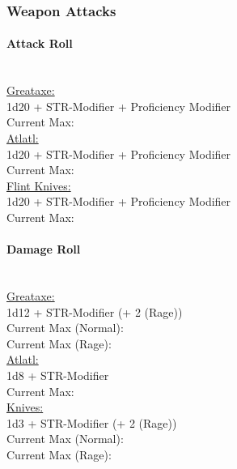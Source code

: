 \documentclass[letterpaper,openany,oneside,twocolumn]{book}
\begin{document}
\subsubsection*{Weapon Attacks}
\paragraph*{Attack Roll}\hfill\\
\underline{Greataxe:}\\
1d20 + STR-Modifier + Proficiency Modifier\\
\indent Current Max: \\
\underline{Atlatl:}\\
1d20 + STR-Modifier + Proficiency Modifier\\
\indent Current Max: \\
\underline{Flint Knives:}\\
1d20 + STR-Modifier + Proficiency Modifier\\
\indent Current Max: 
\paragraph*{Damage Roll}\hfill\\
\underline{Greataxe:}\\
1d12 + STR-Modifier (+ 2 (Rage))\\
\indent Current Max (Normal): \\
\indent Current Max (Rage): \\
\underline{Atlatl:}\\
1d8 + STR-Modifier\\
\indent Current Max: \\
\underline{Knives:}\\
1d3 + STR-Modifier (+ 2 (Rage))\\
\indent Current Max (Normal): \\
\indent Current Max (Rage): \\
\end{document}
